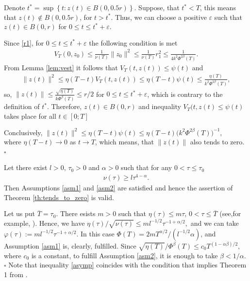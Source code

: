 \documentclass[../main.tex]{subfiles}
\begin{document}
Denote $t^* = \sup \left\{ t: z(t) \in B\left(0,0.5r\right)\right\} $.
Suppose, that $t^* < T$, this means that  $z(t) \notin B(0,0.5r)$, for $t > t^*$. Thus, we can choose  a positive  $ \varepsilon$ such that $z(t) \in B(0,r)$ for $0 \leqslant t \leqslant t^* + \varepsilon$. 

Since \eqref{r1}, for $0 \leqslant t \leqslant t^* + \varepsilon$ the following condition is met
\begin{gather*}
    V_T(0,z_0) \leqslant \frac{1}{\nu(T)} \|z_0\|^2 \leqslant \frac{1}{\nu(T)} r_1^2 \leqslant \frac{1}{4k^2\Phi^{2\beta}(T)}.
\end{gather*}
From Lemma \ref{lem:vest} it follows that 
$V_T(t, z(t))  \leqslant \psi(t) $ and
\begin{gather}\label{z_est}
    \|z(t)\|^2 \leqslant \eta(T-t) V_T(t,z(t)) \leqslant \eta(T-t) \psi(t) \leqslant  \frac{\eta(T)}{k^2\Phi^{2\beta}(T)},
\end{gather}
so, $\|z(t)\| \leqslant \frac{\sqrt{\eta(T)}}{k\Phi^\beta(T)} \leqslant r/2$  for $0\leqslant t \leqslant t^*+\varepsilon$,
which is contrary to the definition of $t^*$.  Therefore, $z(t) \in B(0,r) $  and inequality  $V_T(t,z(t)\leqslant \psi(t)$ takes place  for all $t \in [0; T]$
        
Conclusively,  $ \|z(t)\|^2 \leqslant \eta(T-t)\psi(t) \leqslant \eta(T-t)\big(k^2\Phi^{2\beta}(T)\big)^{-1} $,\\
where $\eta(T-t) \to 0$ as $t \to T$, which means, that $\|z(t)\|$ also tends to zero.
	\hfill $ \square $
\begin{corollary}%
Let there exist $ l > 0$, $\tau_0 > 0$ and $\alpha > 0$ such that for any $0 < \tau \leqslant \tau_0 $
		\begin{gather}\label{asymp}
			\nu(\tau)\geqslant l\tau^{4-\alpha}.
		\end{gather}
 Then  Assumptions \ref{asm1} and \ref{asm2} are satisfied
 and hence the assertion of Theorem \ref{th:tends_to_zero}
 is valid.
\end{corollary}
\doc
Let us put $\overline{T}=\tau_0$. There esists $m>0$ such that $\eta(\tau)\leqslant m \tau$, $0 < \tau \leqslant\overline{T}$ (see,for example, \cite{GusevOsipov}). Hence, we have $
\eta(\tau)/\sqrt{\nu(\tau)} \leqslant  
	 ml^{-1/2}\tau^{-1+\alpha/2},$
and we can take  $\varphi(\tau):=  
	 ml^{-1/2}\tau^{-1+\alpha/2}$. 
In this case 
$\Phi(T)=2mT^{\alpha/2}/(l^{-1/2}\alpha)$,
and Assumption \ref{asm1} is, clearly, fulfilled. Since 
$\sqrt{\eta(T)}/\Phi^\beta(T) \leqslant c_0T^{(1-\alpha\beta)/2},$
where $c_0$ is a constant, to fulfill  Assumption \ref{asm2}, it is enough to take $\beta < 1/\alpha$.
	\hfill $ \square $
Note that inequality \eqref{asymp} coincides with the condition that implies  Theorem 1 from \cite{GusevOsipov}. 
\end{document}
